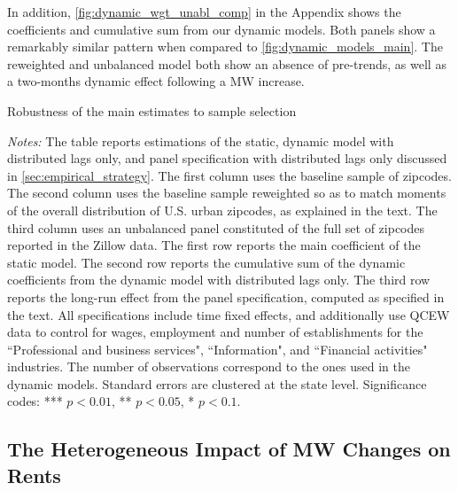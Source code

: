 In addition, \autoref{fig:dynamic_wgt_unabl_comp} in the Appendix shows the coefficients and 
cumulative sum from our dynamic models. Both panels show a remarkably similar pattern when compared 
to \autoref{fig:dynamic_models_main}. The reweighted and unbalanced model both show an absence of 
pre-trends, as well as a two-months dynamic effect following a MW increase.


\begin{table}[h!]\centering
	\caption{Robustness of the main estimates to sample selection}  %
	\label{tab:wgt_unbal_comparison}
	
	\begin{minipage}{0.95\textwidth}\footnotesize
	\vspace{3mm}	
	\textit{Notes:} The table reports estimations of the static, dynamic model with distributed
	lags only, and panel specification with distributed lags only discussed in 
	\autoref{sec:empirical_strategy}. The first column uses the baseline sample of zipcodes. The 
	second column uses the baseline sample reweighted so as to match moments of the overall 
	distribution of U.S. urban zipcodes, as explained in the text. The third column uses an 
	unbalanced 	panel constituted of the full set of zipcodes reported in the Zillow data. The 
	first row reports the main coefficient of the static model. The second row reports the 
	cumulative sum of the dynamic coefficients from the dynamic model with distributed lags only. 
	The third row reports the long-run effect from the panel specification, computed as specified 
	in the text. All specifications include time fixed effects, and additionally use QCEW data to 
	control for wages, employment and number of establishments for the ``Professional and business 
	services", ``Information", and ``Financial activities" industries. The number of observations 
	correspond to the ones used in the dynamic models. Standard errors are clustered at the state 
	level. Significance codes: *** $p < 0.01$, ** $p < 0.05$, * $p < 0.1$.	
	\end{minipage}
\end{table}



\subsection{The Heterogeneous Impact of MW Changes on Rents}\label{sec:heter}

